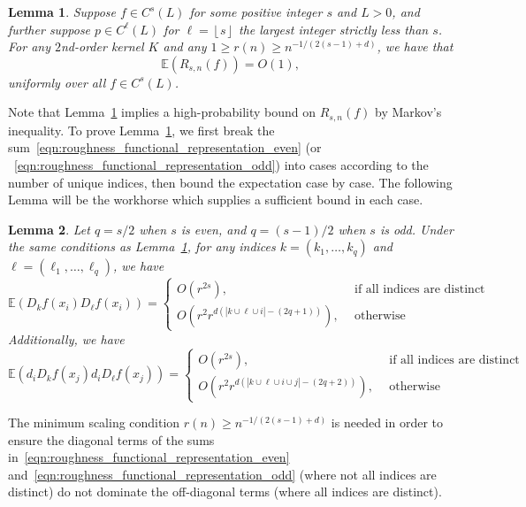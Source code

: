 \documentclass{article}
\newcommand{\abs}[1]{\left \lvert #1 \right \rvert}
\newcommand{\floor}[1]{\left\lfloor #1 \right\rfloor}
\newcommand{\1}{\mathbf{1}}
\newcommand{\Ebb}{\mathbb{E}}
\theoremstyle{alden}
\theoremstyle{aldenthm}
\newtheorem{lemma}{Lemma}
\theoremstyle{definition}
\theoremstyle{remark}
\begin{document}
\begin{lemma}
	\label{lem:roughness_functional_expectation}
	Suppose $f \in C^{s}(L)$ for some positive integer $s$ and $L > 0$, and further suppose $p \in C^{\ell}(L)$ for $\ell = \floor{s}$ the largest integer strictly less than $s$. For any $2$nd-order kernel $K$ and any $1 \geq r(n) \geq n^{-1/(2(s - 1)+d)}$, we have that
	\begin{equation*}
	\Ebb(R_{s,n}(f)) = O(1),
	\end{equation*} 
	uniformly over all $f \in C^{s}(L)$.
\end{lemma}

Note that Lemma~\ref{lem:roughness_functional_expectation} implies a high-probability bound on $R_{s,n}(f)$ by Markov's inequality. To prove Lemma~\ref{lem:roughness_functional_expectation}, we first break the sum~\eqref{eqn:roughness_functional_representation_even} (or ~\eqref{eqn:roughness_functional_representation_odd}) into cases according to the number of unique indices, then bound the expectation case by case. The following Lemma will be the workhorse which supplies a sufficient bound in each case.
\begin{lemma}
	\label{lem:expected_difference_operators}
	Let $q = s/2$ when $s$ is even, and $q = (s - 1)/2$ when $s$ is odd. Under the same conditions as Lemma~\ref{lem:roughness_functional_expectation}, for any indices $k = (k_1,\ldots,k_q)$ and $\ell = (\ell_1,\ldots,\ell_q)$, we have
	\begin{equation}
	\label{eqn:expected_difference_operators_1}
	\Ebb(D_kf(x_i) D_\ell f(x_i)) =
	\begin{cases*}
	O(r^{2s}), & ~~\textrm{if all indices are distinct} \\
	O(r^{2} r^{d(\abs{k \cup \ell \cup i} - (2q + 1))}), & ~~\textrm{otherwise}~ 
	\end{cases*}
	\end{equation}
	Additionally, we have
	\begin{equation}
	\label{eqn:expected_difference_operators_2}
	\Ebb(d_iD_kf(x_j) d_iD_\ell f(x_j)) =
	\begin{cases*}
	O(r^{2s}), & ~~\textrm{if all indices are distinct} \\
	O(r^{2} r^{d(\abs{k \cup \ell \cup i \cup j} - (2q + 2))}), & ~~\textrm{otherwise}~ 
	\end{cases*}
	\end{equation}
\end{lemma}

The minimum scaling condition $r(n) \geq n^{-1/(2(s - 1) + d)}$ is needed in order to ensure the diagonal terms of the sums in~\eqref{eqn:roughness_functional_representation_even} and~\eqref{eqn:roughness_functional_representation_odd} (where not all indices are distinct) do not dominate the off-diagonal terms (where all indices are distinct).
\end{document}
